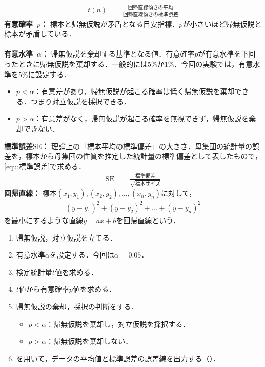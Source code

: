\begin{oframed}
    \begin{align}
        t(n) & = \frac{\textrm{回帰直線傾きの平均}}{\textrm{回帰直線傾きの標準誤差}}\label{equ:t値}
    \end{align}
    \textbf{有意確率\ \(p\)：} 標本と帰無仮説が矛盾となる目安指標．\(p\)が小さいほど帰無仮説と標本が矛盾している．\\ \\
    \textbf{有意水準\ \(\alpha\)：} 帰無仮説を棄却する基準となる値．有意確率\(p\)が有意水準を下回ったときに帰無仮説を棄却する．一般的には\(5\%\)か\(1\%\)．今回の実験では，有意水準を\(5\%\)に設定する．
    \begin{itemize}
        \item \(p<\alpha\)：有意差があり，帰無仮説が起こる確率は低く帰無仮説を棄却できる．つまり対立仮説を採択できる．
        \item \(p>\alpha\)：有意差がなく，帰無仮説が起こる確率を無視できず，帰無仮説を棄却できない．
    \end{itemize}
    \textbf{標準誤差\(\textrm{SE}\)：} 理論上の「標本平均の標準偏差」の大きさ．母集団の統計量の誤差を，標本から母集団の性質を推定した統計量の標準偏差として表したもので，\eqref{equ:標準誤差}で求める．
    \begin{align}
        \textrm{SE} & =\frac{\textrm{標準偏差}}{\sqrt{標本サイズ}}\label{equ:標準誤差}
    \end{align}
    \textbf{回帰直線：} 標本\((x_1,y_1),(x_2,y_2),\dots ,(x_n,y_n)\)に対して，
    \begin{align*}
        (y-y_1)^2+(y-y_2)^2+\dots +(y-y_n)^2
    \end{align*}
    を最小にするような直線\(y=ax+b\)を回帰直線という．\\
    \hfill\cite[p.168, p.187, p.200\ -\ p.205]{Pythonで学ぶあたらしい統計学の教科書}
\end{oframed}
\begin{multicols}{2}
    \begin{enumerate}
        \item 帰無仮説，対立仮説を立てる．
        \item 有意水準\(\alpha\)を設定する．今回は\(\alpha=0.05\)．
        \item 検定統計量\(t\)値を求める．
        \item \(t\)値から有意確率\(p\)値を求める．
              \columnbreak
        \item 帰無仮説の棄却，採択の判断をする．
              \begin{itemize}
                  \item \(p<\alpha\)：帰無仮説を棄却し，対立仮説を採択する．
                  \item \(p>\alpha\)：帰無仮説を棄却しない．
              \end{itemize}
        \item \matlab を用いて，データの平均値と標準誤差の誤差線を出力する（）．
    \end{enumerate}
\end{multicols}
